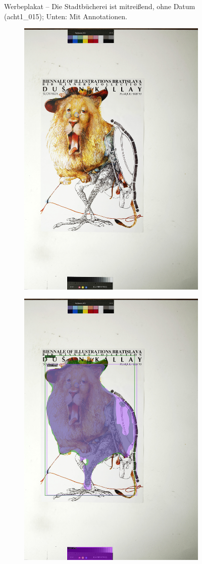 \documentclass[a4paper,12pt,ngerman]{article}
\begin{document}
\begin{figure}[ht]
\begin{subfigure}[b]{\linewidth}
	\end{subfigure}
	\caption{Werbeplakat -- Die Stadtbücherei ist mitreißend, ohne Datum (acht1\_015); Unten: Mit Annotationen.}
\end{figure}

\newpage
\begin{landscape}
\begin{figure}[ht]
	\begin{subfigure}[b]{0.5\linewidth}
	\centering
	\includegraphics[height=\linewidth]{Abbildung_30_(acht1_023)}
	\end{subfigure}
	\begin{subfigure}[b]{0.5\linewidth}
	\centering
	\includegraphics[height=\linewidth]{Abbildung_30_(acht1_023)_with_detections}

\end{subfigure}
\end{figure}
\end{landscape}
\end{document}
